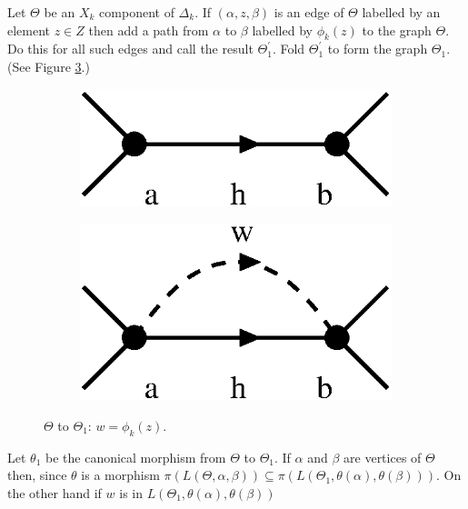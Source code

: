 \documentclass[a4paper,12pt]{article}
\renewcommand{\a}{\alpha }
\renewcommand{\b}{\beta }
\newcommand{\D}{\Delta }
\newcommand{\T}{\Theta }
\numberwithin{equation}{section}
\numberwithin{figure}{section}
\begin{document}
Let $\T$ be an $X_k$ component of $\D_k$. If $(\a,z,\b)$ is an
edge of $\T$ labelled by an element $z\in Z$ then add a path from
$\a$ to $\b$ labelled by $\phi_k(z)$ to the graph $\T$. Do this
for all such edges and call the result
$\T_1^\prime$. Fold $\T_1^\prime$ to form the graph
$\T_1$. (See Figure \ref{fig:alg2-1}.)
\begin{figure}
\begin{center}
\psfrag{a}{$\a$}
\psfrag{b}{$\b$}
\begin{subfigure}[b]{.25\columnwidth}
\includegraphics[scale=.5]{alg2-1a.eps}
\label{fig:alg2-1a}
\end{subfigure}
\raisebox{3ex}{$\leadsto$}
\begin{subfigure}[b]{.25\columnwidth}
\psfrag{a}{$\a$}
\psfrag{b}{$\b$}
\includegraphics[scale=.5]{alg2-1b.eps}
\label{fig:alg2-1b}
\end{subfigure}
\end{center}
\caption{$\Theta$ to $\Theta_1$: $w=\phi_k(z)$.}\label{fig:alg2-1}
\end{figure}
Let $\theta_1$ be the canonical morphism from $\Theta$ to
$\Theta_1$. If $\a$ and $\b$ are vertices of $\Theta$ then,
since $\theta$ is a morphism
$\pi(L(\Theta, \a,\b))\subseteq \pi(L(\Theta_1,\theta(\a),\theta(\b)))$.
On the other hand if $w$ is in  $L(\Theta_1,\theta(\a),\theta(\b))$
\end{document}
